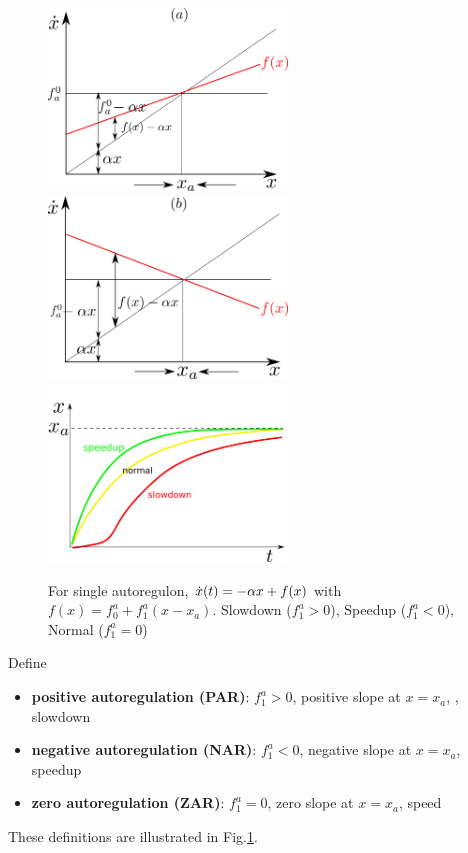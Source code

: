 \begin{figure}[h!]
\centering
\includegraphics[width=2.5in]
{autoregulons/xdot-versus-x.png}
\includegraphics[width=2.5in]
{autoregulons/xdot-versus-x-neg.png}
\includegraphics[width=2.5in]
{autoregulons/fast-normal-slow.png}
\caption{For single autoregulon, $\dot{x}(t)=-\alpha x + f(x)$ with $f(x)=f_0^a + f^a_1(x-x_a)$.
Slowdown ($f_1^a>0$),
Speedup ($f_1^a<0$),  Normal ($f_1^a=0$)
 }
\label{fig-fast-normal-slow}
\end{figure}

Define
\begin{itemize}
\item
{\bf positive autoregulation (PAR)}: $f_1^a >0$, positive slope at $x=x_a$, , slowdown
\item
{\bf negative autoregulation (NAR)}: $f_1^a <0$, negative slope at $x=x_a$, speedup
\item
{\bf zero autoregulation (ZAR)}: $f_1^a =0$, zero slope at $x=x_a$, speed
\end{itemize}
These definitions are illustrated in Fig.\ref{fig-fast-normal-slow}.

